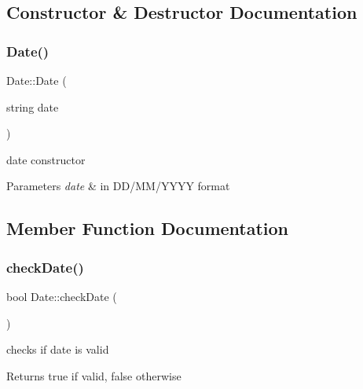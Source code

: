 \subsection{Constructor \& Destructor Documentation}
\hypertarget{class_date_a5532efafed41fd5f8e013a61313200dc}{}\label{class_date_a5532efafed41fd5f8e013a61313200dc} 
\subsubsection{\texorpdfstring{Date()}{Date()}}
{\footnotesize\ttfamily Date\+::\+Date (\begin{DoxyParamCaption}\item[{string}]{date }\end{DoxyParamCaption})}



date constructor 


\begin{DoxyParams}{Parameters}
{\em date} & in D\+D/\+M\+M/\+Y\+Y\+YY format \\
\hline
\end{DoxyParams}


\subsection{Member Function Documentation}
\hypertarget{class_date_ac4810ddec014ca51257871abac9667a9}{}\label{class_date_ac4810ddec014ca51257871abac9667a9} 
\subsubsection{\texorpdfstring{check\+Date()}{checkDate()}}
{\footnotesize\ttfamily bool Date\+::check\+Date (\begin{DoxyParamCaption}{ }\end{DoxyParamCaption})}



checks if date is valid 

\begin{DoxyReturn}{Returns}
true if valid, false otherwise 
\end{DoxyReturn}
\hypertarget{class_date_a8e10a688e6056a4d62a8c5ba5de11e54}{}\label{class_date_a8e10a688e6056a4d62a8c5ba5de11e54} 

